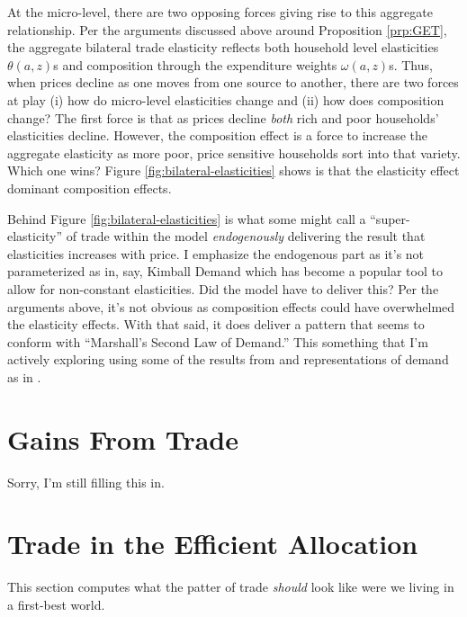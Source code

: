 \documentclass[12pt,pdftex]{article}
\begin{document}
\begin{onehalfspacing}
At the micro-level, there are two opposing forces giving rise to this aggregate relationship. Per the arguments discussed above around Proposition \ref{prp:GET}, the aggregate bilateral trade elasticity reflects both household level elasticities $\theta(a,z)$s and composition through the expenditure weights $\omega(a,z)$s. Thus, when prices decline as one moves from one source to another, there are two forces at play (i) how do micro-level elasticities change and (ii) how does composition change? The first force is that as prices decline \emph{both} rich and poor households' elasticities decline. However, the composition effect is a force to increase the aggregate elasticity as more poor, price sensitive households sort into that variety. Which one wins? Figure \ref{fig:bilateral-elasticities} shows is that the elasticity effect dominant composition effects.

Behind Figure \ref{fig:bilateral-elasticities} is what some might call a  ``super-elasticity'' of trade within the model \emph{endogenously} delivering the result that elasticities increases with price. I emphasize the endogenous part as it's not parameterized as in, say, Kimball Demand which has become a popular tool to allow for non-constant elasticities. Did the model have to deliver this? Per the arguments above, it's not obvious as composition effects could have overwhelmed the elasticity effects. With that said, it does deliver a pattern that seems to conform with ``Marshall's Second Law of Demand.''  This something that I'm actively exploring using some of the results from \citet{p-iq} and representations of demand as in \citet{mrazova2017not}.

\section{Gains From Trade}

Sorry, I'm still filling this in. 

\section{Trade in the Efficient Allocation}

This section computes what the patter of trade \emph{should} look like were we living in a first-best world.


\end{onehalfspacing}
\end{document}
